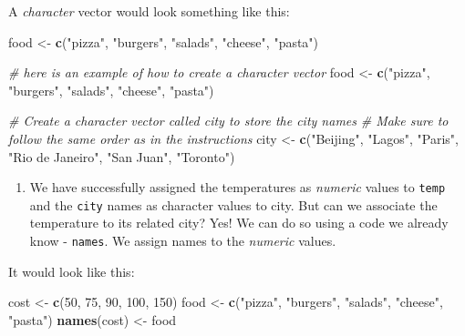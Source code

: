\documentclass[]{article}
\newenvironment{Shaded}{\begin{snugshade}}{\end{snugshade}}
\newcommand{\CommentTok}[1]{\textcolor[rgb]{0.56,0.35,0.01}{\textit{#1}}}
\newcommand{\DecValTok}[1]{\textcolor[rgb]{0.00,0.00,0.81}{#1}}
\newcommand{\KeywordTok}[1]{\textcolor[rgb]{0.13,0.29,0.53}{\textbf{#1}}}
\newcommand{\NormalTok}[1]{#1}
\newcommand{\StringTok}[1]{\textcolor[rgb]{0.31,0.60,0.02}{#1}}
\providecommand{\tightlist}{%
  \setlength{\itemsep}{0pt}\setlength{\parskip}{0pt}}
\begin{document}
A \emph{character} vector would look something like this:

\begin{Shaded}
\begin{Highlighting}[]
\NormalTok{food <-}\StringTok{ }\KeywordTok{c}\NormalTok{(}\StringTok{"pizza"}\NormalTok{, }\StringTok{"burgers"}\NormalTok{, }\StringTok{"salads"}\NormalTok{, }\StringTok{"cheese"}\NormalTok{, }\StringTok{"pasta"}\NormalTok{)}
\end{Highlighting}
\end{Shaded}

\begin{Shaded}
\begin{Highlighting}[]
\CommentTok{# here is an example of how to create a character vector}
\NormalTok{food <-}\StringTok{ }\KeywordTok{c}\NormalTok{(}\StringTok{"pizza"}\NormalTok{, }\StringTok{"burgers"}\NormalTok{, }\StringTok{"salads"}\NormalTok{, }\StringTok{"cheese"}\NormalTok{, }\StringTok{"pasta"}\NormalTok{)}

\CommentTok{# Create a character vector called city to store the city names}
\CommentTok{# Make sure to follow the same order as in the instructions}
\NormalTok{city <-}\StringTok{ }\KeywordTok{c}\NormalTok{(}\StringTok{"Beijing"}\NormalTok{, }\StringTok{"Lagos"}\NormalTok{, }\StringTok{"Paris"}\NormalTok{, }\StringTok{"Rio de Janeiro"}\NormalTok{, }\StringTok{"San Juan"}\NormalTok{, }\StringTok{"Toronto"}\NormalTok{)}
\end{Highlighting}
\end{Shaded}

\begin{enumerate}
\def\labelenumi{\arabic{enumi}.}
\setcounter{enumi}{2}
\tightlist
\item
  We have successfully assigned the temperatures as \emph{numeric}
  values to \texttt{temp} and the \texttt{city} names as character
  values to city. But can we associate the temperature to its related
  city? Yes! We can do so using a code we already know - \texttt{names}.
  We assign names to the \emph{numeric} values.
\end{enumerate}

It would look like this:

\begin{Shaded}
\begin{Highlighting}[]
\NormalTok{cost <-}\StringTok{ }\KeywordTok{c}\NormalTok{(}\DecValTok{50}\NormalTok{, }\DecValTok{75}\NormalTok{, }\DecValTok{90}\NormalTok{, }\DecValTok{100}\NormalTok{, }\DecValTok{150}\NormalTok{)}
\NormalTok{food <-}\StringTok{ }\KeywordTok{c}\NormalTok{(}\StringTok{"pizza"}\NormalTok{, }\StringTok{"burgers"}\NormalTok{, }\StringTok{"salads"}\NormalTok{, }\StringTok{"cheese"}\NormalTok{, }\StringTok{"pasta"}\NormalTok{)}
\KeywordTok{names}\NormalTok{(cost) <-}\StringTok{ }\NormalTok{food}
\end{Highlighting}
\end{Shaded}
\end{document}
